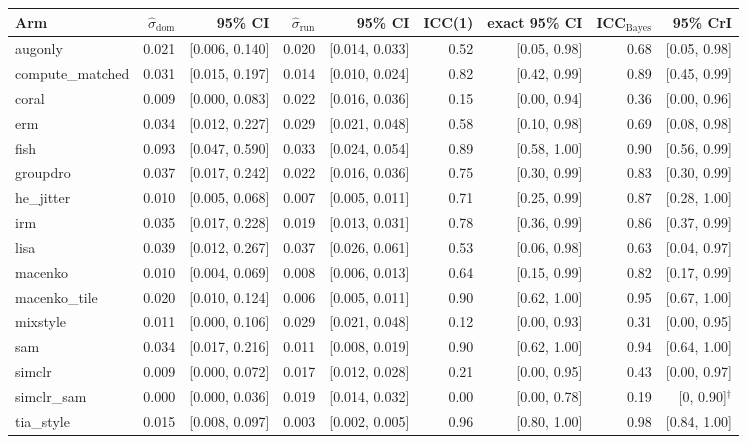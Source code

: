\begin{tabular}{lrrrrrrrr}
\toprule
Arm & $\hat\sigma_\text{dom}$ & 95\% CI & $\hat\sigma_\text{run}$ & 95\% CI & ICC(1) & exact 95\% CI & ICC$_\text{Bayes}$ & 95\% CrI \\
\midrule
augonly & 0.021 & [0.006, 0.140] & 0.020 & [0.014, 0.033] & 0.52 & [0.05, 0.98] & 0.68 & [0.05, 0.98] \\
compute\_matched & 0.031 & [0.015, 0.197] & 0.014 & [0.010, 0.024] & 0.82 & [0.42, 0.99] & 0.89 & [0.45, 0.99] \\
coral & 0.009 & [0.000, 0.083] & 0.022 & [0.016, 0.036] & 0.15 & [0.00, 0.94] & 0.36 & [0.00, 0.96] \\
erm & 0.034 & [0.012, 0.227] & 0.029 & [0.021, 0.048] & 0.58 & [0.10, 0.98] & 0.69 & [0.08, 0.98] \\
fish & 0.093 & [0.047, 0.590] & 0.033 & [0.024, 0.054] & 0.89 & [0.58, 1.00] & 0.90 & [0.56, 0.99] \\
groupdro & 0.037 & [0.017, 0.242] & 0.022 & [0.016, 0.036] & 0.75 & [0.30, 0.99] & 0.83 & [0.30, 0.99] \\
he\_jitter & 0.010 & [0.005, 0.068] & 0.007 & [0.005, 0.011] & 0.71 & [0.25, 0.99] & 0.87 & [0.28, 1.00] \\
irm & 0.035 & [0.017, 0.228] & 0.019 & [0.013, 0.031] & 0.78 & [0.36, 0.99] & 0.86 & [0.37, 0.99] \\
lisa & 0.039 & [0.012, 0.267] & 0.037 & [0.026, 0.061] & 0.53 & [0.06, 0.98] & 0.63 & [0.04, 0.97] \\
macenko & 0.010 & [0.004, 0.069] & 0.008 & [0.006, 0.013] & 0.64 & [0.15, 0.99] & 0.82 & [0.17, 0.99] \\
macenko\_tile & 0.020 & [0.010, 0.124] & 0.006 & [0.005, 0.011] & 0.90 & [0.62, 1.00] & 0.95 & [0.67, 1.00] \\
mixstyle & 0.011 & [0.000, 0.106] & 0.029 & [0.021, 0.048] & 0.12 & [0.00, 0.93] & 0.31 & [0.00, 0.95] \\
sam & 0.034 & [0.017, 0.216] & 0.011 & [0.008, 0.019] & 0.90 & [0.62, 1.00] & 0.94 & [0.64, 1.00] \\
simclr & 0.009 & [0.000, 0.072] & 0.017 & [0.012, 0.028] & 0.21 & [0.00, 0.95] & 0.43 & [0.00, 0.97] \\
simclr\_sam & 0.000 & [0.000, 0.036] & 0.019 & [0.014, 0.032] & 0.00 & [0.00, 0.78] & 0.19 & [0, 0.90]$^\dagger$ \\
tia\_style & 0.015 & [0.008, 0.097] & 0.003 & [0.002, 0.005] & 0.96 & [0.80, 1.00] & 0.98 & [0.84, 1.00] \\
\bottomrule
\end{tabular}
